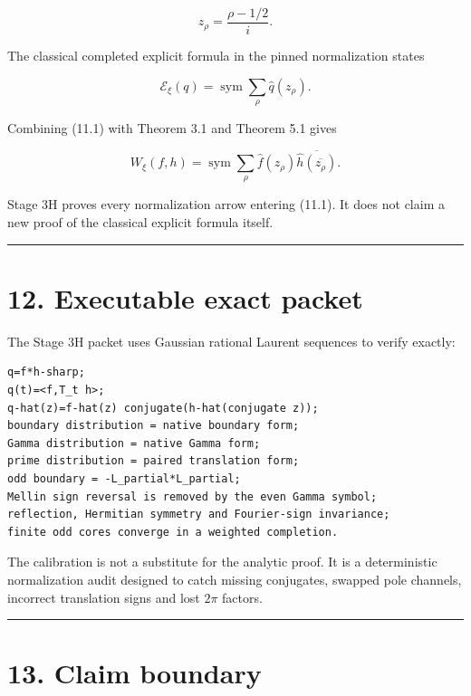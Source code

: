 \[
z_\rho=\frac{\rho-1/2}{i}.
\]

The classical completed explicit formula in the pinned normalization states

\[
\boxed{
\mathcal E_\xi(q)
=\operatorname*{sym}\sum_\rho\widehat q(z_\rho).
}
\tag{11.1}
\]

Combining (11.1) with Theorem 3.1 and Theorem 5.1 gives

\[
\boxed{
W_\xi(f,h)
=
\operatorname*{sym}\sum_\rho
\widehat f(z_\rho)
\overline{\widehat h(\overline{z_\rho})}.
}
\tag{11.2}
\]

Stage 3H proves every normalization arrow entering (11.1). It does not claim a
new proof of the classical explicit formula itself.

\begin{center}\rule{0.5\linewidth}{0.5pt}\end{center}

\hypertarget{executable-exact-packet}{%
\section{12. Executable exact packet}\label{executable-exact-packet}}

The Stage 3H packet uses Gaussian rational Laurent sequences to verify exactly:

\begin{verbatim}
q=f*h-sharp;
q(t)=<f,T_t h>;
q-hat(z)=f-hat(z) conjugate(h-hat(conjugate z));
boundary distribution = native boundary form;
Gamma distribution = native Gamma form;
prime distribution = paired translation form;
odd boundary = -L_partial*L_partial;
Mellin sign reversal is removed by the even Gamma symbol;
reflection, Hermitian symmetry and Fourier-sign invariance;
finite odd cores converge in a weighted completion.
\end{verbatim}

The calibration is not a substitute for the analytic proof. It is a deterministic
normalization audit designed to catch missing conjugates, swapped pole channels,
incorrect translation signs and lost \(2\pi\) factors.

\begin{center}\rule{0.5\linewidth}{0.5pt}\end{center}

\hypertarget{claim-boundary}{%
\section{13. Claim boundary}\label{claim-boundary}}

